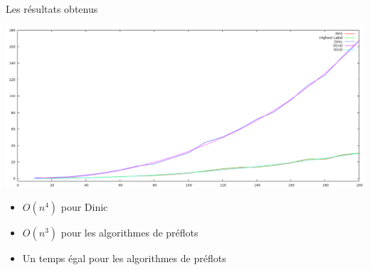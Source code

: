 \begin{frame}{Les résultats obtenus}
	\begin{minipage}[c]{0.50\linewidth}
		\includegraphics[scale=0.6]{img/resultat.png}
	\end{minipage}\hfill
	\begin{minipage}[c]{0.40\linewidth}
		\begin{itemize}
			\item $O(n^4)$ pour Dinic
			\item $O(n^3)$ pour les algorithmes de préflots
			\item Un temps égal pour les algorithmes de préflots
		\end{itemize}
	\end{minipage}
\end{frame}

